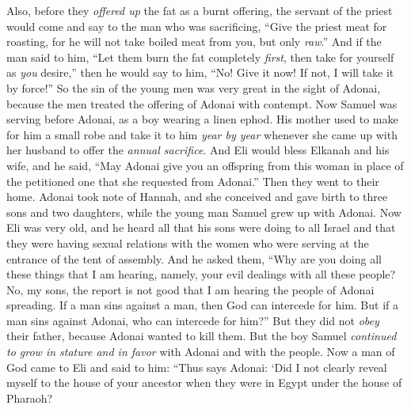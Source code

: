\begin{biblechapter}
\verse Also, before they \textit{offered up} the fat as a burnt offering, the servant of the priest would come and say to the man who was sacrificing, “Give the priest meat for roasting, for he will not take boiled meat from you, but only \textit{raw}.”
\verse And if the man said to him, “Let them burn the fat completely \textit{first}, then take for yourself as \textit{you} desire,” then he would say to him, “No! Give it now! If not, I will take it by force!”
\verse So the sin of the young men was very great in the sight of Adonai, because the men treated the offering of Adonai with contempt.
 Now Samuel was serving before Adonai, as a boy wearing a linen ephod.
\verse His mother used to make for him a small robe and take it to him \textit{year by year} whenever she came up with her husband to offer the \textit{annual sacrifice}.
\verse And Eli would bless Elkanah and his wife, and he said, “May Adonai give you an offspring from this woman in place of the petitioned one that she requested from Adonai.” Then they went to their home.
\verse Adonai took note of Hannah, and she conceived and gave birth to three sons and two daughters, while the young man Samuel grew up with Adonai.
 Now Eli was very old, and he heard all that his sons were doing to all Israel and that they were having sexual relations with the women who were serving at the entrance of the tent of assembly.
\verse And he asked them, “Why are you doing all these things that I am hearing, namely, your evil dealings with all these people?
\verse No, my sons, the report is not good that I am hearing the people of Adonai spreading.
\verse If a man sins against a man, then God can intercede for him. But if a man sins against Adonai, who can intercede for him?” But they did not \textit{obey} their father, because Adonai wanted to kill them.
\verse But the boy Samuel \textit{continued to grow in stature and in favor} with Adonai and with the people.
 Now a man of God came to Eli and said to him: “Thus says Adonai: ‘Did I not clearly reveal myself to the house of your ancestor when they were in Egypt under the house of Pharaoh?

\end{biblechapter}
